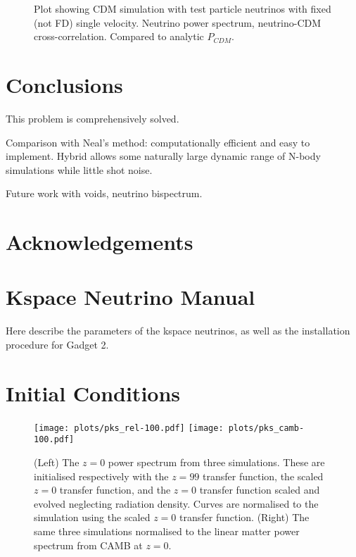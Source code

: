 \documentclass[useAMS, usenatbib]{mnras}
\begin{document}
\begin{figure}
    \caption{Plot showing CDM simulation with test particle neutrinos with fixed (not FD) single velocity.
  Neutrino power spectrum, neutrino-CDM cross-correlation. Compared to analytic $P_{CDM}$.}
  \label{fig:testpart}
\end{figure}


\section{Conclusions}
\label{sec:conclusion}

This problem is comprehensively solved.

Comparison with Neal's method:
computationally efficient and easy to implement.
Hybrid allows some naturally large dynamic range of N-body simulations while little shot noise.

Future work with voids, neutrino bispectrum.

\section*{Acknowledgements}

\appendix

\section{Kspace Neutrino Manual}
\label{sec:manual}

Here describe the parameters of the kspace neutrinos,
as well as the installation procedure for Gadget 2.

\section{Initial Conditions}
\label{sec:initcond}

\begin{figure*}
\texttt{[image: plots/pks\_rel-100.pdf]}
\texttt{[image: plots/pks\_camb-100.pdf]}
  \caption{(Left) The $z=0$ power spectrum from three simulations. 
  These are initialised respectively with the $z=99$ transfer function, 
  the scaled $z=0$ transfer function, and the $z=0$ transfer function 
  scaled and evolved neglecting radiation density. 
  Curves are normalised to the simulation using the scaled $z=0$ transfer function.
  (Right) The same three simulations normalised to the linear matter 
  power spectrum from CAMB at $z=0$.}
  \label{fig:rescaling}
\end{figure*}
\end{document}
